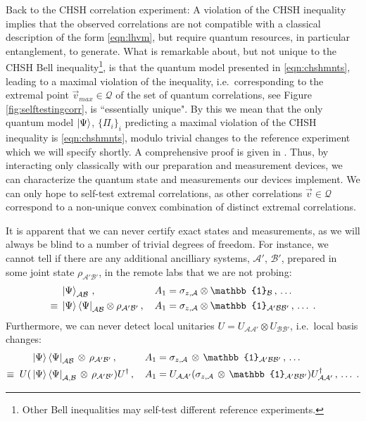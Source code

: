 Back to the CHSH correlation experiment: A violation of the CHSH inequality implies that the observed correlations are not compatible with a classical description of the form \ref{eqn:lhvm}, but require quantum resources, in particular entanglement, to generate. What is remarkable about, but not unique to the CHSH Bell inequality\footnote{Other Bell inequalities may self-test different reference experiments.}, is that the quantum model presented in \ref{eqn:chshmnts}, leading to a maximal violation of the inequality, i.e.\ corresponding to the extremal point $\Vec{v}_{max}\in\mathcal{Q}$ of the set of quantum correlations, see Figure \ref{fig:selftestingcorr}, is ``essentially unique". By this we mean that the only quantum model $\ket{\Psi}$, $\{\Pi_i\}_i$ predicting a maximal violation of the CHSH inequality is \ref{eqn:chshmnts}, modulo trivial changes to the reference experiment which we will specify shortly. A comprehensive proof is given in \cite{Supic2020}.
Thus, by interacting only classically with our preparation and measurement devices, we can characterize the quantum state and measurements our devices implement. We can only hope to self-test extremal correlations, as other correlations $\Vec{v}\in\mathcal{Q}$ correspond to a non-unique convex combination of distinct extremal correlations. 

It is apparent that we can never certify exact states and measurements, as we will always be blind to a number of trivial degrees of freedom. For instance, we cannot tell if there are any additional ancilliary systems, $\mathcal{A'}$, $\mathcal{B'}$, prepared in some joint state $\rho_{\mathcal{A'B'}}$, in the remote labs that we are not probing:
\begin{align*}
    & \ket{\Psi}_\mathcal{AB}\thinspace,\thinspace && A_{1} = \sigma_{z,\mathcal{A}}\otimes\mathbb{1}_{\mathcal{B}}\thinspace,\thinspace \dots \\
    \equiv\; & \ket{\Psi}\bra{\Psi}_{\mathcal{AB}}\otimes\rho_{\mathcal{A'B'}}\thinspace,\thinspace && A_1 = \sigma_{z,\mathcal{A}}\otimes\mathbb{1}_{\mathcal{A'BB'}}\thinspace,\thinspace\dots\; .
\end{align*}
Furthermore, we can never detect local unitaries $U=U_\mathcal{AA'}\otimes U_\mathcal{BB'}$, i.e.\ local basis changes:
\begin{align*}
    & \ket{\Psi}\bra{\Psi}_{\mathcal{AB}}\thinspace\otimes\thinspace\rho_{\mathcal{A'B'}}\thinspace,\thinspace && A_1 = \sigma_{z,\mathcal{A}}\thinspace\otimes\thinspace\mathbb{1}_{\mathcal{A'BB'}}\thinspace,\thinspace\dots \\ 
    \equiv\;  U(& \ket{\Psi}\bra{\Psi}_{\mathcal{A,B}}\thinspace\otimes\thinspace\rho_{\mathcal{A'B'}})U^{\dag}\thinspace,\thinspace && A_1 = U_{\mathcal{AA'}}(\sigma_{z,\mathcal{A}}\thinspace\otimes\thinspace\mathbb{1}_{\mathcal{A'BB'}})U_{\mathcal{AA'}}^{\dag}\thinspace,\thinspace\dots\; .
\end{align*}

